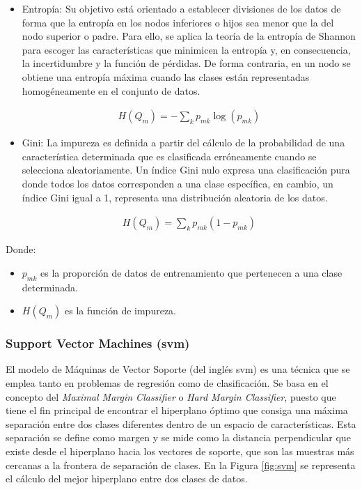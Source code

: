 \begin{itemize}
    \item Entropía: Su objetivo está orientado a establecer divisiones de los datos de forma que la entropía en los nodos inferiores o hijos sea menor que la del nodo superior o padre. Para ello, se aplica la teoría de la entropía de Shannon \cite{rfmedium2} para escoger las características que minimicen la entropía y, en consecuencia, la incertidumbre y la función de pérdidas. De forma contraria, en un nodo se obtiene una entropía máxima cuando las clases están representadas homogéneamente en el conjunto de datos.
    
    \begin{equation}
        \begin{aligned}
            H(Q_m) = - \sum_k p_{mk} \log(p_{mk})
        \end{aligned}
    \end{equation}
    
    \item Gini: La impureza es definida a partir del cálculo de la probabilidad de una característica determinada que es clasificada erróneamente cuando se selecciona aleatoriamente. Un índice Gini nulo expresa una clasificación pura donde todos los datos corresponden a una clase específica, en cambio, un índice Gini igual a 1, representa una distribución aleatoria de los datos.
    
    \begin{equation}
        \begin{aligned}
            H(Q_m) = \sum_k p_{mk} (1 - p_{mk})
        \end{aligned}
    \end{equation}
\end{itemize}

Donde:
\begin{itemize}
    \renewcommand{\labelitemi}{}
    \item \(p_{mk}\) es la proporción de datos de entrenamiento que pertenecen a una clase determinada.
    \item \(H(Q_m)\) es la función de impureza.
\end{itemize}


\subsubsection{Support Vector Machines (\acrshort{svm})}
\label{sec:mlsvm}

El modelo de Máquinas de Vector Soporte (del inglés \acrfull{svm}) es una técnica que se emplea tanto en problemas de regresión como de clasificación. Se basa en el concepto del \textit{Maximal Margin Classifier} o \textit{Hard Margin Classifier}, puesto que tiene el fin principal de encontrar el hiperplano óptimo que consiga una máxima separación entre dos clases diferentes dentro de un espacio de características. Esta separación se define como margen y se mide como la distancia perpendicular que existe desde el hiperplano hacia los vectores de soporte, que son las muestras más cercanas a la frontera de separación de clases. En la Figura \ref{fig:svm} se representa el cálculo del mejor hiperplano entre dos clases de datos. \cite{svmmedium2} \cite{svmciencia}

